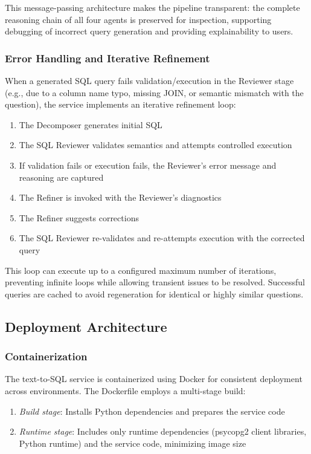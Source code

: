 This message-passing architecture makes the pipeline transparent: the complete reasoning chain of all four agents is preserved for inspection, supporting debugging of incorrect query generation and providing explainability to users.

\subsubsection{Error Handling and Iterative Refinement}

When a generated SQL query fails validation/execution in the Reviewer stage (e.g., due to a column name typo, missing JOIN, or semantic mismatch with the question), the service implements an iterative refinement loop:

\begin{enumerate}
    \item The Decomposer generates initial SQL
    \item The SQL Reviewer validates semantics and attempts controlled execution
    \item If validation fails or execution fails, the Reviewer's error message and reasoning are captured
    \item The Refiner is invoked with the Reviewer's diagnostics
    \item The Refiner suggests corrections
    \item The SQL Reviewer re-validates and re-attempts execution with the corrected query
\end{enumerate}

This loop can execute up to a configured maximum number of iterations, preventing infinite loops while allowing transient issues to be resolved. Successful queries are cached to avoid regeneration for identical or highly similar questions.

\subsection{Deployment Architecture}

\subsubsection{Containerization}

The text-to-SQL service is containerized using Docker for consistent deployment across environments. The Dockerfile employs a multi-stage build:

\begin{enumerate}
    \item \textit{Build stage}: Installs Python dependencies and prepares the service code
    \item \textit{Runtime stage}: Includes only runtime dependencies (psycopg2 client libraries, Python runtime) and the service code, minimizing image size
\end{enumerate}

